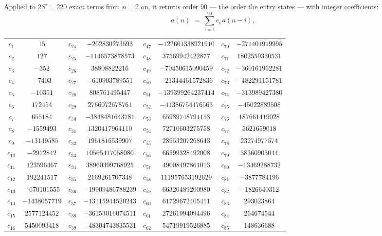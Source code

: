 \documentclass[11pt,a4paper]{article}
\theoremstyle{plain}
\theoremstyle{definition}
\begin{document}
Applied to $2S'=220$ exact terms from $n=2$ on, it returns order $90$ --- the
order the entry states --- with integer coefficients:
\[
a(n)\;=\;\sum_{i=1}^{90}c_i\,a(n-i),
\]
\begin{center}\small
\begin{tabular}{cccccccc}
$c_{1}$ & $15$ & $c_{24}$ & $-202830273593$ & $c_{47}$ & $-122601338921910$ & $c_{70}$ & $-271401919995$ \\
$c_{2}$ & $127$ & $c_{25}$ & $-1146573878573$ & $c_{48}$ & $37569942422877$ & $c_{71}$ & $1802559330531$ \\
$c_{3}$ & $-352$ & $c_{26}$ & $38808822216$ & $c_{49}$ & $-70450615090459$ & $c_{72}$ & $-360161962281$ \\
$c_{4}$ & $-7403$ & $c_{27}$ & $-610903789551$ & $c_{50}$ & $-21344461572836$ & $c_{73}$ & $-482291151781$ \\
$c_{5}$ & $-10351$ & $c_{28}$ & $808761495447$ & $c_{51}$ & $-139399264237414$ & $c_{74}$ & $-313989427380$ \\
$c_{6}$ & $172454$ & $c_{29}$ & $2766072678761$ & $c_{52}$ & $-41386754476563$ & $c_{75}$ & $-45022889508$ \\
$c_{7}$ & $655184$ & $c_{30}$ & $-3848481643781$ & $c_{53}$ & $65989748791158$ & $c_{76}$ & $187661419028$ \\
$c_{8}$ & $-1559493$ & $c_{31}$ & $1320417964110$ & $c_{54}$ & $72710603275758$ & $c_{77}$ & $5621659018$ \\
$c_{9}$ & $-13149585$ & $c_{32}$ & $1961816539907$ & $c_{55}$ & $28953207268643$ & $c_{78}$ & $23274977574$ \\
$c_{10}$ & $-2972842$ & $c_{33}$ & $10565417058080$ & $c_{56}$ & $66599328492008$ & $c_{79}$ & $38360903044$ \\
$c_{11}$ & $123596467$ & $c_{34}$ & $38960399768925$ & $c_{57}$ & $49008497861013$ & $c_{80}$ & $-13469288732$ \\
$c_{12}$ & $192241517$ & $c_{35}$ & $2169261707348$ & $c_{58}$ & $111957653192629$ & $c_{81}$ & $-3877784196$ \\
$c_{13}$ & $-670101555$ & $c_{36}$ & $-19909486788239$ & $c_{59}$ & $66320489200980$ & $c_{82}$ & $-1826640312$ \\
$c_{14}$ & $-1438057719$ & $c_{37}$ & $-13115944520243$ & $c_{60}$ & $61729672405411$ & $c_{83}$ & $293023864$ \\
$c_{15}$ & $2577124452$ & $c_{38}$ & $-36153016074511$ & $c_{61}$ & $27261994094496$ & $c_{84}$ & $264674544$ \\
$c_{16}$ & $5450093418$ & $c_{39}$ & $-48304743835531$ & $c_{62}$ & $54719919526885$ & $c_{85}$ & $148636688$ \\

\end{tabular}
\end{center}
\end{document}
